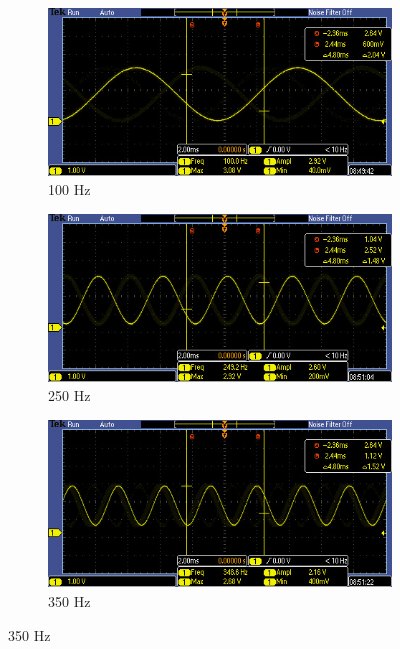 \documentclass[12pt]{article}
\begin{document}
\begin{figure}[H]
  \begin{subfigure}[b]{0.45\textwidth}
    \includegraphics[width=\textwidth]{./img/TEK00002}
    \caption{100 Hz}
    \label{fig:dig_100}
  \end{subfigure}
  \begin{subfigure}[b]{0.45\textwidth}
    \includegraphics[width=\textwidth]{./img/TEK00003}
    \caption{250 Hz}
    \label{fig:dig_250}
  \end{subfigure}
  \begin{subfigure}[b]{0.45\textwidth}
    \includegraphics[width=\textwidth]{./img/TEK00004}
    \caption{350 Hz}
    \label{fig:dig_350}

\end{subfigure}
\end{figure}
\end{document}
